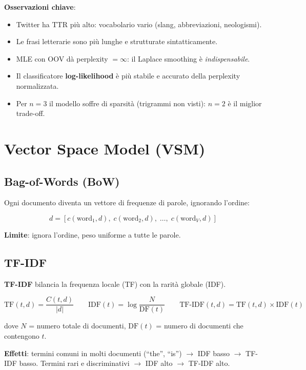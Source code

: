 \documentclass[12pt,a4paper]{article}
\begin{document}
\textbf{Osservazioni chiave}:
\begin{itemize}[leftmargin=1.5em]
  \item Twitter ha TTR più alto: vocabolario vario (slang, abbreviazioni, neologismi).
  \item Le frasi letterarie sono più lunghe e strutturate sintatticamente.
  \item MLE con OOV dà perplexity $= \infty$: il Laplace smoothing è \emph{indispensabile}.
  \item Il classificatore \textbf{log-likelihood} è più stabile e accurato della perplexity normalizzata.
  \item Per $n=3$ il modello soffre di sparsità (trigrammi non visti): $n=2$ è il miglior trade-off.
\end{itemize}

\section{Vector Space Model (VSM)}

\subsection{Bag-of-Words (BoW)}

Ogni documento diventa un vettore di frequenze di parole, ignorando l'ordine:

\[
d = [c(\text{word}_1, d),\; c(\text{word}_2, d),\; \dots,\; c(\text{word}_V, d)]
\]

\textbf{Limite}: ignora l'ordine, peso uniforme a tutte le parole.

\subsection{TF-IDF}

\textbf{TF-IDF} bilancia la frequenza locale (TF) con la rarità globale (IDF).

\begin{formulabox}
\[
\text{TF}(t, d) = \frac{C(t,d)}{|d|}
\qquad
\text{IDF}(t) = \log\!\frac{N}{\text{DF}(t)}
\qquad
\text{TF-IDF}(t, d) = \text{TF}(t,d) \times \text{IDF}(t)
\]
\end{formulabox}

dove $N$ = numero totale di documenti, $\text{DF}(t)$ = numero di documenti che contengono $t$.

\textbf{Effetti}: termini comuni in molti documenti (``the'', ``is'') $\to$ IDF basso $\to$ TF-IDF basso. Termini rari e discriminativi $\to$ IDF alto $\to$ TF-IDF alto.
\end{document}
